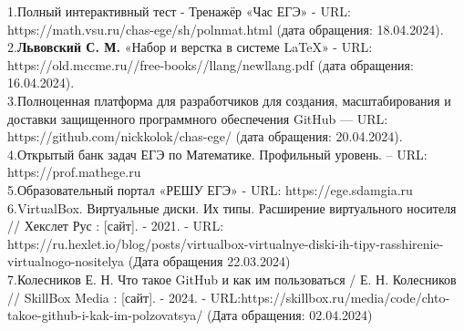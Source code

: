 1.\quad Полный интерактивный тест - Тренажёр «Час ЕГЭ» - URL: 
https://math.vsu.ru/chas-ege/sh/polnmat.html (дата обращения: 
18.04.2024).
\\2.\quad \textbf{Львовский С. М.} «Набор и верстка в системе LaTeX» - 
URL: https://old.mccme.ru//free-books//llang/newllang.pdf (дата 
обращения: 16.04.2024).
\\3.\quad Полноценная платформа для разработчиков для создания, 
масштабирования и доставки защищенного программного 
обеспечения GitHub — URL: https://github.com/nickkolok/chas-ege/ (дата 
обращения: 20.04.2024).  
\\4.\quad Открытый банк задач ЕГЭ по Математике. Профильный уровень. – 
URL: https://prof.mathege.ru
\\5.\quad Образовательный портал «РЕШУ ЕГЭ» - URL: https://ege.sdamgia.ru
\\6.\quad VirtualBox. Виртуальные диски. Их типы. Расширение виртуального носителя // Хекслет Рус : [сайт]. - 2021. - URL: https://ru.hexlet.io/blog/posts/virtualbox-virtualnye-diski-ih-tipy-rasshirenie-virtualnogo-nositelya (Дата обращения 22.03.2024)
\\7.\quad Колесников Е. Н. Что такое GitHub и как им пользоваться / Е. Н. Колесников // SkillBox Media : [сайт]. - 2024. - URL:https://skillbox.ru/media/code/chto-takoe-github-i-kak-im-polzovatsya/ (Дата обращения: 02.04.2024)